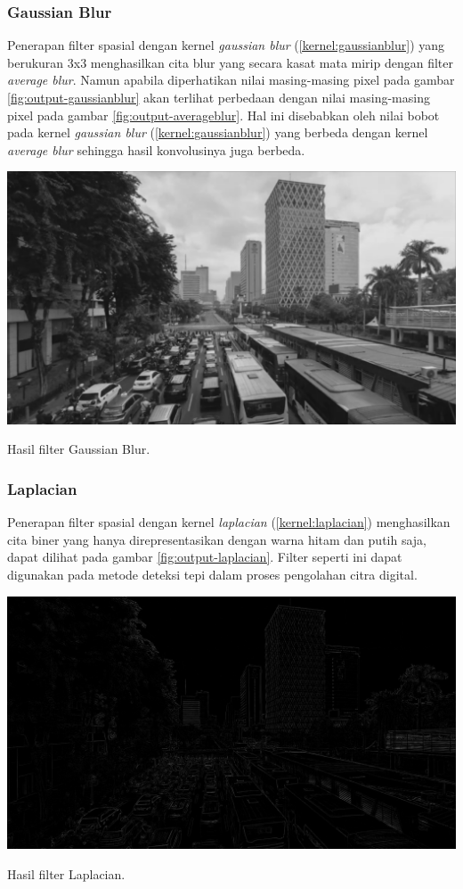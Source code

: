 \subsubsection{Gaussian Blur}
Penerapan filter spasial dengan kernel \textit{gaussian blur} (\ref{kernel:gaussianblur}) yang berukuran 3x3 menghasilkan cita blur yang secara kasat mata mirip dengan filter \textit{average blur}. Namun apabila diperhatikan nilai masing-masing pixel pada gambar \ref{fig:output-gaussianblur} akan terlihat perbedaan dengan nilai masing-masing pixel pada gambar \ref{fig:output-averageblur}. Hal ini disebabkan oleh nilai bobot pada kernel \textit{gaussian blur} (\ref{kernel:gaussianblur}) yang berbeda dengan kernel \textit{average blur} sehingga hasil konvolusinya juga berbeda. 
\begin{afigure}
    \includegraphics[width=0.8\linewidth, center]{images/output-image/input1-gaussianblur.png}
    \caption{Hasil filter Gaussian Blur.}
    \label{fig:output-gaussianblur}
\end{afigure}

\subsubsection{Laplacian}
Penerapan filter spasial dengan kernel \textit{laplacian} (\ref{kernel:laplacian}) menghasilkan cita biner yang hanya direpresentasikan dengan warna hitam dan putih saja, dapat dilihat pada gambar \ref{fig:output-laplacian}. Filter seperti ini dapat digunakan pada metode deteksi tepi dalam proses pengolahan citra digital.
\begin{afigure}
    \includegraphics[width=0.8\linewidth, center]{images/output-image/input1-laplacian.png}
    \caption{Hasil filter Laplacian.}
    \label{fig:output-laplacian}
\end{afigure}

